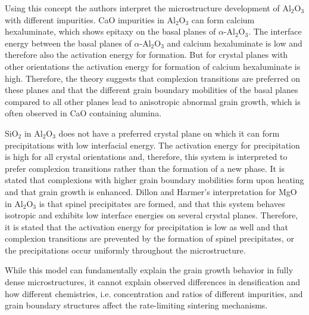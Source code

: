 Using this concept the authors interpret the microstructure development of Al$_{2}$O$_{3}$ with different impurities. CaO impurities in Al$_{2}$O$_{3}$ can form calcium hexaluminate, which shows epitaxy on the basal planes of $\alpha$-Al$_{2}$O$_{3}$. The interface energy between the basal planes of $\alpha$-Al$_{2}$O$_{3}$ and calcium hexaluminate is low and therefore also the activation energy for formation. But for crystal planes with other orientations the activation energy for formation of calcium hexaluminate is high. Therefore, the theory suggests that complexion transitions are preferred on these planes and that the different grain boundary mobilities of the basal planes compared to all other planes lead to anisotropic abnormal grain growth, which is often observed in CaO containing alumina. 

SiO$_{2}$ in Al$_{2}$O$_{3}$ does not have a preferred crystal plane on which it can form precipitations with low interfacial energy. The activation energy for precipitation is high for all crystal orientations and, therefore, this system is interpreted to prefer complexion transitions rather than the formation of a new phase. It is stated that complexions with higher grain boundary mobilities form upon heating and that grain growth is enhanced. Dillon and Harmer’s \cite{Dillon2007a,Dillon2008} interpretation for MgO in Al$_{2}$O$_{3}$ is that spinel precipitates are formed, and that this system behaves isotropic and exhibits low interface energies on several crystal planes. Therefore, it is stated that the activation energy for precipitation is low as well and that complexion transitions are prevented by the formation of spinel precipitates, or the precipitations occur uniformly throughout the microstructure. 

While this model can fundamentally explain the grain growth behavior in fully dense microstructures, it cannot explain observed differences in densification and how different chemistries, i.e. concentration and ratios of different impurities, and grain boundary structures affect the rate-limiting sintering mechanisms. 

